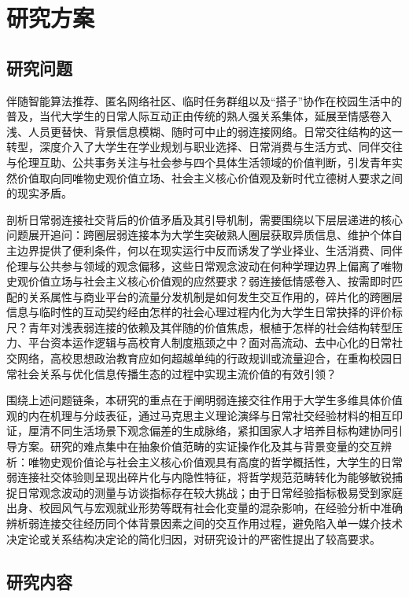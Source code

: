\section{研究方案}

\subsection{研究问题}

伴随智能算法推荐、匿名网络社区、临时任务群组以及“搭子”协作在校园生活中的普及，当代大学生的日常人际互动正由传统的熟人强关系集体，延展至情感卷入浅、人员更替快、背景信息模糊、随时可中止的弱连接网络。日常交往结构的这一转型，深度介入了大学生在学业规划与职业选择、日常消费与生活方式、同伴交往与伦理互助、公共事务关注与社会参与四个具体生活领域的价值判断，引发青年实然价值取向同唯物史观价值立场、社会主义核心价值观及新时代立德树人要求之间的现实矛盾。

剖析日常弱连接社交背后的价值矛盾及其引导机制，需要围绕以下层层递进的核心问题展开追问：跨圈层弱连接本为大学生突破熟人圈层获取异质信息、维护个体自主边界提供了便利条件，何以在现实运行中反而诱发了学业择业、生活消费、同伴伦理与公共参与领域的观念偏移，这些日常观念波动在何种学理边界上偏离了唯物史观价值立场与社会主义核心价值观的应然要求？弱连接低情感卷入、按需即时匹配的关系属性与商业平台的流量分发机制是如何发生交互作用的，碎片化的跨圈层信息与临时性的互动契约经由怎样的社会心理过程内化为大学生日常抉择的评价标尺？青年对浅表弱连接的依赖及其伴随的价值焦虑，根植于怎样的社会结构转型压力、平台资本运作逻辑与高校育人制度瓶颈之中？面对高流动、去中心化的日常社交网络，高校思想政治教育应如何超越单纯的行政规训或流量迎合，在重构校园日常社会关系与优化信息传播生态的过程中实现主流价值的有效引领？

围绕上述问题链条，本研究的重点在于阐明弱连接交往作用于大学生多维具体价值观的内在机理与分歧表征，通过马克思主义理论演绎与日常社交经验材料的相互印证，厘清不同生活场景下观念偏差的生成脉络，紧扣国家人才培养目标构建协同引导方案。研究的难点集中在抽象价值范畴的实证操作化及其与背景变量的交互辨析：唯物史观价值论与社会主义核心价值观具有高度的哲学概括性，大学生的日常弱连接社交体验则呈现出碎片化与内隐性特征，将哲学规范范畴转化为能够敏锐捕捉日常观念波动的测量与访谈指标存在较大挑战；由于日常经验指标极易受到家庭出身、校园风气与宏观就业形势等既有社会化变量的混杂影响，在经验分析中准确辨析弱连接交往经历同个体背景因素之间的交互作用过程，避免陷入单一媒介技术决定论或关系结构决定论的简化归因，对研究设计的严密性提出了较高要求。

\subsection{研究内容}

